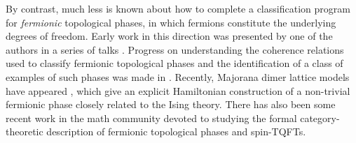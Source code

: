 By contrast, much less is known about how to complete a classification program for {\it fermionic} topological phases, in which fermions constitute 
the underlying degrees of freedom. 
Early work in this direction was presented by one of the authors in a series of talks \cite{Walker2013,Walker2014,Walker2015}.
Progress on understanding the coherence relations used to classify fermionic topological phases and the identification of a class of examples of such phases was made in \cite{gu2015,gu2014,Lan2016b}. 
Recently, Majorana dimer lattice models have appeared \cite{tarantino2016,ware2016}, 
which give an explicit Hamiltonian construction of a 
non-trivial fermionic phase closely related to the Ising theory. 
There has also been some recent work in the math community \cite{usher2016,brundan2016,bruillard2017,bonderson2017} 
devoted to studying the formal category-theoretic description of fermionic topological phases and spin-TQFTs. 

